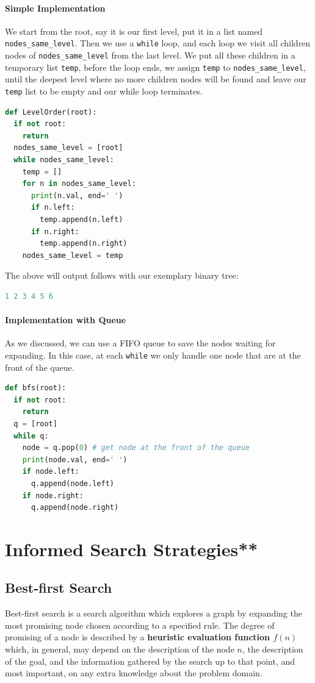 \documentclass[../main.tex]{subfiles}
\begin{document}
\paragraph{Simple Implementation} We start from the root, say it is our first level, put it in a list named \texttt{nodes\_same\_level}. Then we use a \texttt{while} loop, and each loop we visit all children nodes of \texttt{nodes\_same\_level} from the last level. We put all these children in a temporary list \texttt{temp}, before the loop ends, we assign \texttt{temp} to \texttt{nodes\_same\_level}, until the deepest level where no more children nodes will be found and leave our \texttt{temp} list to be empty and our while loop terminates. 
\begin{lstlisting}[language = Python]
def LevelOrder(root):
  if not root:
    return
  nodes_same_level = [root]
  while nodes_same_level:
    temp = []
    for n in nodes_same_level:
      print(n.val, end=' ')
      if n.left:
        temp.append(n.left)
      if n.right:
        temp.append(n.right)
    nodes_same_level = temp
\end{lstlisting}
The above will output  follows with our exemplary binary tree:
\begin{lstlisting}[language=Python]
1 2 3 4 5 6 
\end{lstlisting}

\paragraph{Implementation with Queue} As we discussed, we can use a FIFO queue to save the nodes waiting for expanding. In this case, at each \texttt{while} we only handle one node that are at the front of the queue. 
\begin{lstlisting}[language=Python]
def bfs(root):
  if not root:
    return
  q = [root]
  while q:
    node = q.pop(0) # get node at the front of the queue
    print(node.val, end=' ')
    if node.left:
      q.append(node.left)
    if node.right:
      q.append(node.right)
\end{lstlisting}



\section{Informed Search Strategies**}
\subsection{Best-first Search}
 Best-first search is a search algorithm which explores a graph by expanding the most promising node  chosen according to a specified rule. The degree of promising of a node is described by a \textbf{heuristic evaluation function $f(n)$} which, in general, may depend on the description of the node $n$, the description of the goal, and the information gathered by the search up to that point, and most important, on any extra knowledge about the problem domain. 
 
\end{document}
